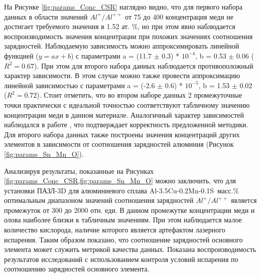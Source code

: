 На Рисунке \cref{fig:params_Conc_CSR} наглядно видно, что для первого набора данных в области значений $Al^{+}/Al^{++}$ от 75 до 400 концентрация меди не достигает требуемого значения в 1.52 ат. \%, но при этом явно наблюдается воспроизводимость значения концентрации при похожих значениях соотношения зарядностей. Наблюдаемую зависимость можно аппроксимировать линейной функцией ($y = ax + b$) с параметрами a = (11.7 $\pm$ 0.3) * $10^{-4}$, b = 0.53 $\pm$ 0.06 ($R^{2} = 0.67$). При этом для второго набора данных наблюдается противоположный характер зависимости. В этом случае можно также провести аппроксимацию линейной зависимостью с параметрами a = (-2.6 $\pm$ 0.6) * $10^{-5}$, b = 1.53 $\pm$ 0.02 ($R^{2} = 0.72$). Стоит отметить, что во втором наборе данных 2 промежуточные точки практически с идеальной точностью соответствуют табличному значению концентрации меди в данном материале. Аналогичный характер зависимостей наблюдался в работе \cite{Mancini14}, что подтверждает корректность предложенной методики. Для второго набора данных также построены значения концентраций других элементов  в зависимости от соотношения зарядностей алюминия (Рисунок \cref{fig:params_Sn_Mn_O}).


Анализируя результаты, показанные на Рисунках \cref{fig:params_Conc_CSR,fig:params_Sn_Mn_O} можно заключить, что для установки ПАЗЛ-3D для алюминиевого сплава Al-3.5Cu-0.2Mn-0.1S~масс.\% оптимальным диапазоном значений соотношения зарядностей $Al^{+}/Al^{++}$ является промежуток от 300 до 2000 отн. еди. В данном промежутке концентрации меди и олова наиболее близки к табличным значениям. При этом наблюдается малое количество кислорода, наличие которого является артефактом лазерного испарения. Таким образом показано, что соотношение зарядностей основного элемента может служить метрикой качества данных. Показана воспроизводимость результатов исследований с использованием контроля условий испарения по соотношению зарядностей основного элемента.

